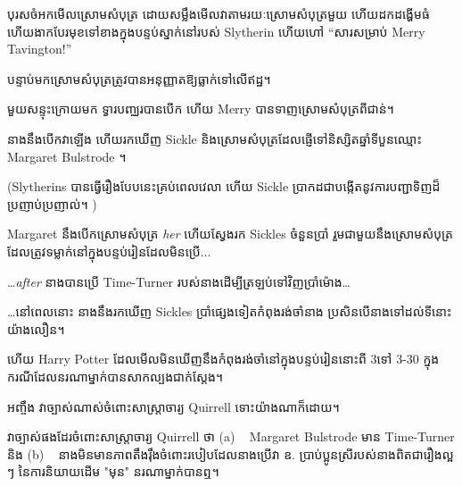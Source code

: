 បុរសចំអកមើលស្រោមសំបុត្រ ដោយសម្លឹងមើលវាតាមរយៈស្រោមសំបុត្រមួយ ហើយដកដង្ហើមធំ ហើយងាកបែរមុខទៅខាងក្នុងបន្ទប់ស្នាក់នៅរបស់ Slytherin ហើយហៅ “សារសម្រាប់ Merry Tavington!”

បន្ទាប់មកស្រោមសំបុត្រត្រូវបានអនុញ្ញាតឱ្យធ្លាក់ទៅលើឥដ្ឋ។

មួយ​សន្ទុះ​ក្រោយ​មក ទ្វារ​បញ្ឈរ​បាន​បើក ហើយ Merry បាន​ទាញ​ស្រោម​សំបុត្រ​ពី​ជាន់។

នាង​នឹង​បើក​វា​ឡើង ហើយ​រក​ឃើញ Sickle និង​ស្រោម​សំបុត្រ​ដែល​ផ្ញើ​ទៅ​និស្សិត​ឆ្នាំ​ទី​បួន​ឈ្មោះ Margaret Bulstrode ។

(Slytherins បានធ្វើរឿងបែបនេះគ្រប់ពេលវេលា ហើយ Sickle ប្រាកដជាបង្កើតនូវការបញ្ជាទិញដ៏ប្រញាប់ប្រញាល់។ )

Margaret នឹងបើកស្រោមសំបុត្រ \emph{her} ហើយស្វែងរក Sickles ចំនួនប្រាំ រួមជាមួយនឹងស្រោមសំបុត្រដែលត្រូវទម្លាក់នៅក្នុងបន្ទប់រៀនដែលមិនប្រើ...

…\emph{after} នាងបានប្រើ Time-Turner របស់នាងដើម្បីត្រឡប់ទៅវិញប្រាំម៉ោង…

…នៅពេលនោះ នាងនឹងរកឃើញ Sickles ប្រាំផ្សេងទៀតកំពុងរង់ចាំនាង ប្រសិនបើនាងទៅដល់ទីនោះយ៉ាងលឿន។

ហើយ Harry Potter ដែលមើលមិនឃើញនឹងកំពុងរង់ចាំនៅក្នុងបន្ទប់រៀននោះពី 3\pm ទៅ 3-30 ក្នុងករណីដែលនរណាម្នាក់បានសាកល្បងជាក់ស្តែង។

អញ្ចឹង វាច្បាស់ណាស់ចំពោះសាស្រ្តាចារ្យ Quirrell ទោះយ៉ាងណាក៏ដោយ។

វាច្បាស់ផងដែរចំពោះសាស្រ្តាចារ្យ Quirrell ថា (a) ~ Margaret Bulstrode មាន Time-Turner និង (b) ~ នាងមិនមានភាពតឹងរ៉ឹងចំពោះរបៀបដែលនាងប្រើវា ឧ. ប្រាប់ប្អូនស្រីរបស់នាងពិតជារឿងល្អ ៗ នៃការនិយាយដើម "មុន" នរណាម្នាក់បានឮ។

